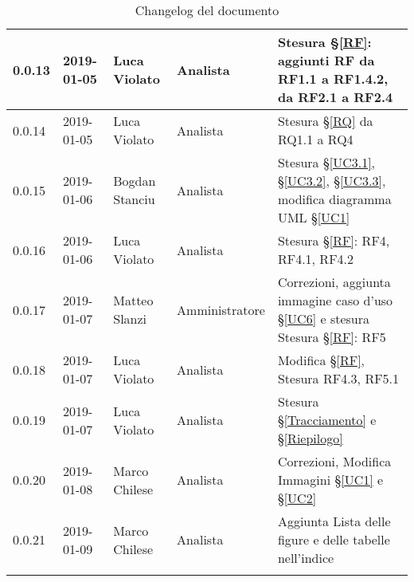 \begin{center}
\begin{longtable}[c]{|m{}|m{}|m{}|m{}|p{}|}
\hline
0.0.13 & 2019-01-05 & Luca Violato & Analista & Stesura §\ref{RF}: aggiunti RF da RF1.1 a RF1.4.2, da RF2.1 a RF2.4\\
\hline
\rowcolor{grigio}0.0.14 & 2019-01-05 & Luca Violato & Analista & Stesura §\ref{RQ} da RQ1.1 a RQ4\\
\hline
0.0.15 & 2019-01-06 & Bogdan Stanciu & Analista & Stesura §\ref{UC3.1}, §\ref{UC3.2}, §\ref{UC3.3}, modifica diagramma UML §\ref{UC1} \\
\hline
\rowcolor{grigio}0.0.16 & 2019-01-06 & Luca Violato & Analista & Stesura §\ref{RF}: RF4, RF4.1, RF4.2\\
\hline
0.0.17 & 2019-01-07 & Matteo Slanzi & Amministratore & Correzioni, aggiunta immagine caso d'uso §\ref{UC6} e
stesura Stesura §\ref{RF}: RF5\\
\hline
\rowcolor{grigio}0.0.18 & 2019-01-07 & Luca Violato & Analista & Modifica §\ref{RF}, Stesura RF4.3, RF5.1\\
\hline
0.0.19 & 2019-01-07 & Luca Violato & Analista & Stesura §\ref{Tracciamento} e §\ref{Riepilogo}\\
\hline
\rowcolor{grigio}0.0.20 & 2019-01-08 & Marco Chilese & Analista & Correzioni, Modifica Immagini §\ref{UC1} e §\ref{UC2}\\
\hline
0.0.21 & 2019-01-09 & Marco Chilese & Analista & Aggiunta Lista delle figure e delle tabelle nell'indice\\
\hline
\caption{Changelog del documento}
\end{longtable}
\end{center}